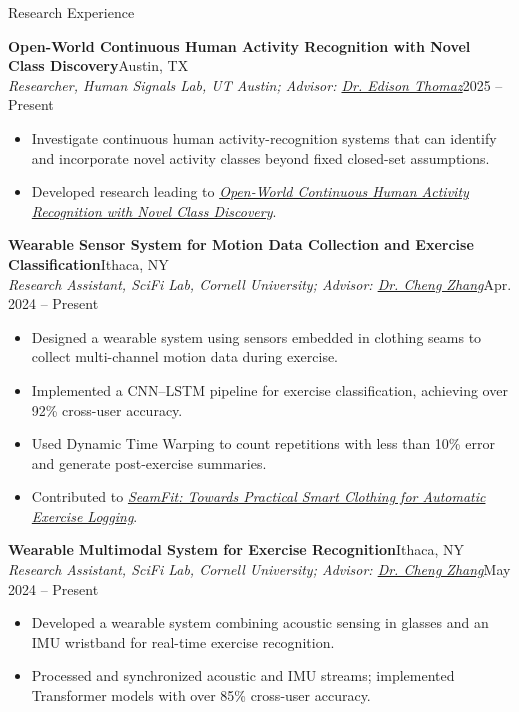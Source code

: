 \documentclass{resume}
\begin{document}
\begin{rSection}{Research Experience}
\vspace{-1.25em}
\item \textbf{Open-World Continuous Human Activity Recognition with Novel Class Discovery}\hfill Austin, TX\\
\textit{Researcher, Human Signals Lab, UT Austin; Advisor: \href{https://users.ece.utexas.edu/~ethomaz/}{Dr. Edison Thomaz}}\hfill 2025 -- Present
\begin{itemize}[leftmargin=0.15in]
\itemsep -6pt
\item Investigate continuous human activity-recognition systems that can identify and incorporate novel activity classes beyond fixed closed-set assumptions.
\item Developed research leading to \href{https://dl.acm.org/doi/10.1145/3842436.3843804}{\textit{Open-World Continuous Human Activity Recognition with Novel Class Discovery}}.
\end{itemize}

\item \textbf{Wearable Sensor System for Motion Data Collection and Exercise Classification}\hfill Ithaca, NY\\
\textit{Research Assistant, SciFi Lab, Cornell University; Advisor: \href{https://czhang.org/}{Dr. Cheng Zhang}}\hfill Apr. 2024 -- Present
\begin{itemize}[leftmargin=0.15in]
\itemsep -6pt
\item Designed a wearable system using sensors embedded in clothing seams to collect multi-channel motion data during exercise.
\item Implemented a CNN--LSTM pipeline for exercise classification, achieving over 92\% cross-user accuracy.
\item Used Dynamic Time Warping to count repetitions with less than 10\% error and generate post-exercise summaries.
\item Contributed to \href{https://dl.acm.org/doi/10.1145/3712287}{\textit{SeamFit: Towards Practical Smart Clothing for Automatic Exercise Logging}}.
\end{itemize}

\item \textbf{Wearable Multimodal System for Exercise Recognition}\hfill Ithaca, NY\\
\textit{Research Assistant, SciFi Lab, Cornell University; Advisor: \href{https://czhang.org/}{Dr. Cheng Zhang}}\hfill May 2024 -- Present
\begin{itemize}[leftmargin=0.15in]
\itemsep -6pt
\item Developed a wearable system combining acoustic sensing in glasses and an IMU wristband for real-time exercise recognition.
\item Processed and synchronized acoustic and IMU streams; implemented Transformer models with over 85\% cross-user accuracy.
\end{itemize}


\end{rSection}
\end{document}
